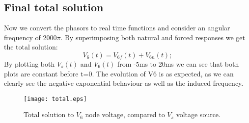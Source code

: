 \subsection{Final total solution}
Now we convert the phasors to real time functions and consider an angular frequency of $2000\pi$. By superimposing both natural and forced responses we get the total solution:
\begin{equation}
V_{6}(t)=V_{6f}(t)+V_{6n}(t);
\end{equation}
By plotting both $V_s(t)$ and $V_6(t)$ from -5ms to 20ms we can see that both plots are constant before t=0. The evolution of V6 is as expected, as we can clearly see the negative exponential behaviour as well as the induced frequency.
\begin{figure}[h] \centering
\texttt{[image: total.eps]}
\caption{Total solution to $V_{6}$ node voltage, compared to $V_{s}$ voltage source.}
\end{figure}

